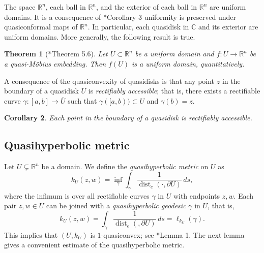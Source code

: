 \documentclass[letterpaper]{amsart}
\theoremstyle{plain}
\newtheorem{theorem}{Theorem}
\newtheorem{corollary}[theorem]{Corollary}
\theoremstyle{definition}
\theoremstyle{remark}
\numberwithin{equation}{section}
\numberwithin{theorem}{section}
\renewcommand{\bar}{\overline}
\newcommand{\R}{\mathbb R}
\newcommand{\C}{\mathbb C}
\DeclareMathOperator{\dist}{dist}
\begin{document}
The space $\R^n$, each ball in $\R^n$, and the exterior of each ball in $\R^n$ are uniform domains. It is a consequence of \cite{GehringOsgood:uniform}*{Corollary 3} uniformity is preserved under quasiconformal maps of $\R^n$. In particular, each quasidisk in $\C$ and its exterior are uniform domains. More generally, the following result is true. 

\begin{theorem}[\cite{Vaisala:quasimobius}*{Theorem 5.6}]\label{theorem:qm_uniform}
Let $U\subset \R^n$ be a uniform domain and $f\colon U\to \R^n$ be a quasi-M\"obius embedding. Then $f(U)$ is a uniform domain, quantitatively. 
\end{theorem}

A consequence of the quasiconvexity of quasidisks is that any point $z$ in the boundary of a quasidisk $U$ is \textit{rectifiably accessible}; that is, there exists a rectifiable curve $\gamma\colon [a,b]\to \bar U$ such that $\gamma([a,b))\subset U$ and $\gamma(b)=z$.

\begin{corollary}\label{cor:quasidisk:rectifiably_accessible}
Each point in the boundary of a quasidisk is rectifiably accessible. 
\end{corollary}

\subsection{Quasihyperbolic metric}

Let $U\subsetneq \R^n$ be a domain. We define the \textit{quasihyperbolic metric} on $U$ as
$$k_U(z,w) =\inf_\gamma \int_\gamma \frac{1}{\dist_e(\cdot,\partial U)}\,ds, $$
where the infimum is over all rectifiable curves $\gamma$ in $U$ with endpoints $z,w$. Each pair $z,w\in U$ can be joined with a \textit{quasihyperbolic geodesic} $\gamma$ in $U$, that is, 
$$k_U(z,w)=\int_\gamma \frac{1}{\dist_e(, \partial U)}\, ds= \ell_{k_U}(\gamma).$$
This implies that $(U,k_U)$ is $1$-quasiconvex; see \cite{GehringOsgood:uniform}*{Lemma 1}. The next lemma gives a convenient estimate of the quasihyperbolic metric. 
\end{document}
